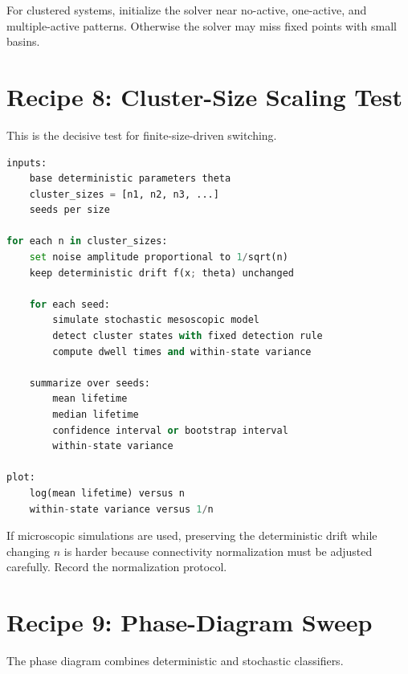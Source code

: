 For clustered systems, initialize the solver near no-active, one-active, and multiple-active patterns. Otherwise the solver may miss fixed points with small basins.

\section{Recipe 8: Cluster-Size Scaling Test}
\label{app:recipe-cluster-size-scaling}

This is the decisive test for finite-size-driven switching.

\begin{lstlisting}[language=Python,caption={Pseudocode for cluster-size scaling.}]
inputs:
    base deterministic parameters theta
    cluster_sizes = [n1, n2, n3, ...]
    seeds per size

for each n in cluster_sizes:
    set noise amplitude proportional to 1/sqrt(n)
    keep deterministic drift f(x; theta) unchanged

    for each seed:
        simulate stochastic mesoscopic model
        detect cluster states with fixed detection rule
        compute dwell times and within-state variance

    summarize over seeds:
        mean lifetime
        median lifetime
        confidence interval or bootstrap interval
        within-state variance

plot:
    log(mean lifetime) versus n
    within-state variance versus 1/n
\end{lstlisting}

If microscopic simulations are used, preserving the deterministic drift while changing $n$ is harder because connectivity normalization must be adjusted carefully. Record the normalization protocol.

\section{Recipe 9: Phase-Diagram Sweep}
\label{app:recipe-phase-diagram-sweep}

The phase diagram combines deterministic and stochastic classifiers.

